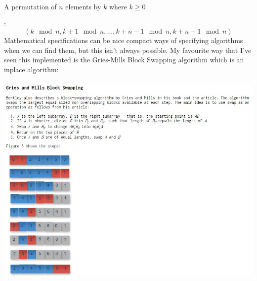 \documentclass[12pt]{article}
\begin{document}
\centerline{A permutation of $n$ elements by $k$ where $k\geq 0$}:
$$(k\mod{n},k+1\mod{n},\dots,k+n-1\mod{n},k+n-1\mod{n})$$
Mathematical specifications can be nice compact ways of specifying algorithms when we can find them, but this isn't always possible. My favourite way that I've seen this implemented is the Gries-Mills Block Swapping algorithm which is an inplace algorithm:\\\\
\noindent \includegraphics[scale = 0.65]{griesmills.jpg}
\newpage
\end{document}
